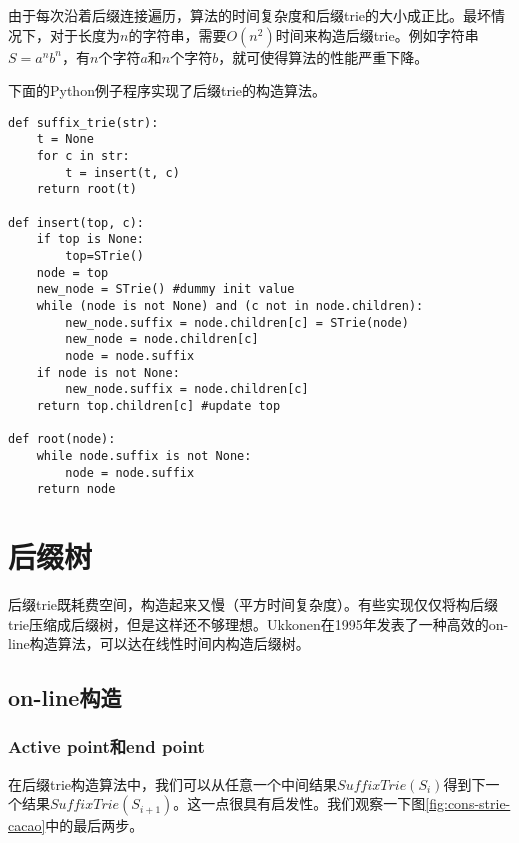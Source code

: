 \documentclass[UTF8]{article}
\begin{document}
由于每次沿着后缀连接遍历，算法的时间复杂度和后缀trie的大小成正比。最坏情况下，对于长度为$n$的字符串，需要$O(n^2)$时间来构造后缀trie。例如字符串$S=a^nb^n$，有$n$个字符$a$和$n$个字符$b$，就可使得算法的性能严重下降。

下面的Python例子程序实现了后缀trie的构造算法。

\lstset{language=Python}
\begin{lstlisting}
def suffix_trie(str):
    t = None
    for c in str:
        t = insert(t, c)
    return root(t)

def insert(top, c):
    if top is None:
        top=STrie()
    node = top
    new_node = STrie() #dummy init value
    while (node is not None) and (c not in node.children):
        new_node.suffix = node.children[c] = STrie(node)
        new_node = node.children[c]
        node = node.suffix
    if node is not None:
        new_node.suffix = node.children[c]
    return top.children[c] #update top

def root(node):
    while node.suffix is not None:
        node = node.suffix
    return node
\end{lstlisting}

\section{后缀树}

后缀trie既耗费空间，构造起来又慢（平方时间复杂度）。有些实现仅仅将构后缀trie压缩成后缀树\cite{trivial-stree-java}，但是这样还不够理想。Ukkonen在1995年发表了一种高效的on-line构造算法，可以达在线性时间内构造后缀树。

\subsection{on-line构造}

\subsubsection{Active point和end point}
\label{ap-and-ep}

在后缀trie构造算法中，我们可以从任意一个中间结果$SuffixTrie(S_i)$得到下一个结果$SuffixTrie(S_{i+1})$。这一点很具有启发性。我们观察一下图\ref{fig:cons-strie-cacao}中的最后两步。
\end{document}
